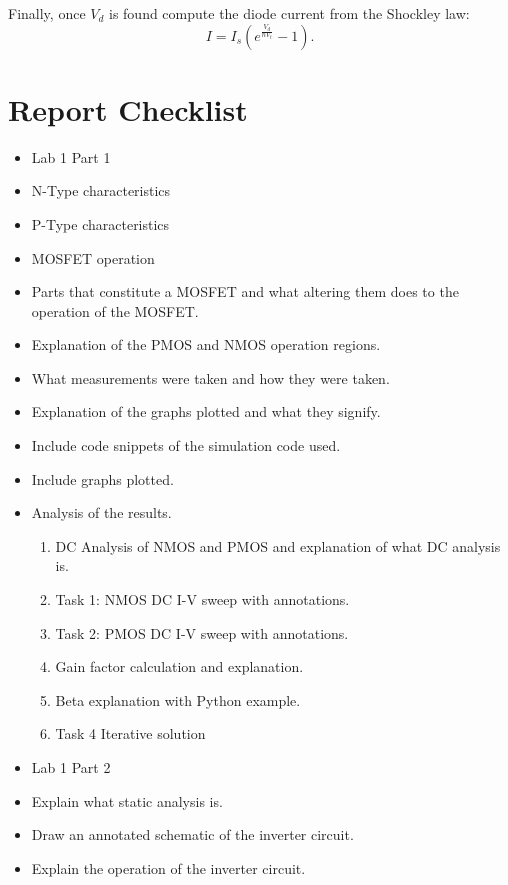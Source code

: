 \documentclass[a4paper,12pt]{article}
\begin{document}
Finally, once \(V_d\) is found compute the diode current from the Shockley law:
\begin{equation}
I = I_s\!\left(e^{\frac{V_d}{nV_t}} - 1\right).
\end{equation}


\section{Report Checklist}

\begin{itemize}
    \item Lab 1 Part 1
    \item N-Type characteristics
    \item P-Type characteristics
    \item MOSFET operation
    \item Parts that constitute a MOSFET and what altering them does to the operation of the MOSFET.
    \item Explanation of the PMOS and NMOS operation regions.
    \item What measurements were taken and how they were taken.
    \item Explanation of the graphs plotted and what they signify.
    \item Include code snippets of the simulation code used.
    \item Include graphs plotted.
    \item Analysis of the results.
    \begin{enumerate}
        \item DC Analysis of NMOS and PMOS and explanation of what DC analysis is.
        \item Task 1: NMOS DC I-V sweep with annotations.
        \item Task 2: PMOS DC I-V sweep with annotations.
        \item Gain factor calculation and explanation.
        \item Beta explanation with Python example.
        \item Task 4 Iterative solution
    \end{enumerate}
    \item Lab 1 Part 2
    \item Explain what static analysis is.
    \item Draw an annotated schematic of the inverter circuit.
    \item Explain the operation of the inverter circuit.

\end{itemize}
\end{document}
